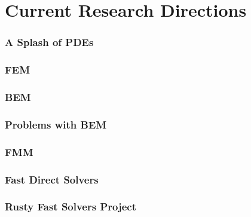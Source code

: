 \section{Current Research Directions}

\begin{frame}
    \frametitle{A Splash of PDEs}
\end{frame}


\begin{frame}
    \frametitle{FEM}
\end{frame}


\begin{frame}
    \frametitle{BEM}
\end{frame}


\begin{frame}
    \frametitle{Problems with BEM}
\end{frame}


\begin{frame}
    \frametitle{FMM}
\end{frame}


\begin{frame}
    \frametitle{Fast Direct Solvers}
\end{frame}

\begin{frame}
    \frametitle{Rusty Fast Solvers Project}
\end{frame}